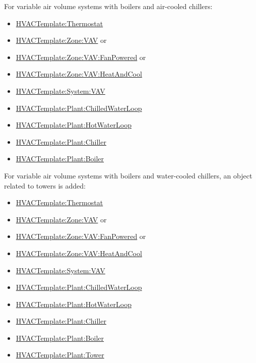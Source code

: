 For variable air volume systems with boilers and air-cooled chillers:

\begin{itemize}
\item
  \hyperref[hvactemplatethermostat]{HVACTemplate:Thermostat}
\item
  \hyperref[hvactemplatezonevav]{HVACTemplate:Zone:VAV} or
\item
  \hyperref[hvactemplatezonevavfanpowered]{HVACTemplate:Zone:VAV:FanPowered} or
\item
  \hyperref[hvactemplatezonevavheatandcool]{HVACTemplate:Zone:VAV:HeatAndCool}
\item
  \hyperref[hvactemplatesystemvav]{HVACTemplate:System:VAV}
\item
  \hyperref[hvactemplateplantchilledwaterloop]{HVACTemplate:Plant:ChilledWaterLoop}
\item
  \hyperref[hvactemplateplanthotwaterloop]{HVACTemplate:Plant:HotWaterLoop}
\item
  \hyperref[hvactemplateplantchiller]{HVACTemplate:Plant:Chiller}
\item
  \hyperref[hvactemplateplantboiler]{HVACTemplate:Plant:Boiler}
\end{itemize}

For variable air volume systems with boilers and water-cooled chillers, an object related to towers is added:

\begin{itemize}
\item
  \hyperref[hvactemplatethermostat]{HVACTemplate:Thermostat}
\item
  \hyperref[hvactemplatezonevav]{HVACTemplate:Zone:VAV} or
\item
  \hyperref[hvactemplatezonevavfanpowered]{HVACTemplate:Zone:VAV:FanPowered} or
\item
  \hyperref[hvactemplatezonevavheatandcool]{HVACTemplate:Zone:VAV:HeatAndCool}
\item
  \hyperref[hvactemplatesystemvav]{HVACTemplate:System:VAV}
\item
  \hyperref[hvactemplateplantchilledwaterloop]{HVACTemplate:Plant:ChilledWaterLoop}
\item
  \hyperref[hvactemplateplanthotwaterloop]{HVACTemplate:Plant:HotWaterLoop}
\item
  \hyperref[hvactemplateplantchiller]{HVACTemplate:Plant:Chiller}
\item
  \hyperref[hvactemplateplantboiler]{HVACTemplate:Plant:Boiler}
\item
  \hyperref[hvactemplateplanttower]{HVACTemplate:Plant:Tower}
\end{itemize}

